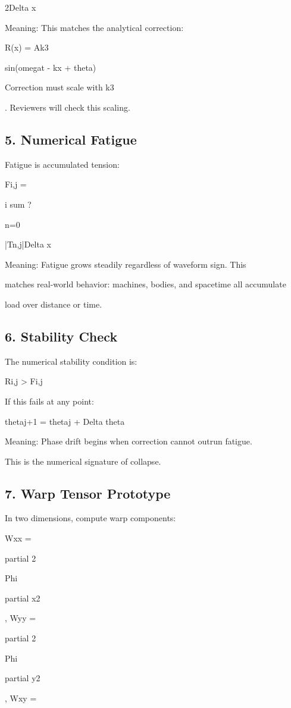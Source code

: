 \documentclass[10pt]{article}
\begin{document}
2Delta x

Meaning: This matches the analytical correction:

R(x) = Ak3

sin(omegat - kx + theta)

Correction must scale with k3

. Reviewers will check this scaling.

\subsection*{5. Numerical Fatigue}
Fatigue is accumulated tension:

Fi,j =

i sum ?

n=0

|Tn,j|Delta x

Meaning: Fatigue grows steadily regardless of waveform sign. This

matches real-world behavior: machines, bodies, and spacetime all accumulate

load over distance or time.

\subsection*{6. Stability Check}
The numerical stability condition is:

Ri,j > Fi,j

If this fails at any point:

thetaj+1 = thetaj + Delta theta

Meaning: Phase drift begins when correction cannot outrun fatigue.

This is the numerical signature of collapse.


\subsection*{7. Warp Tensor Prototype}
In two dimensions, compute warp components:

Wxx =

partial 2

Phi

partial x2

, Wyy =

partial 2

Phi

partial y2

, Wxy =
\end{document}
